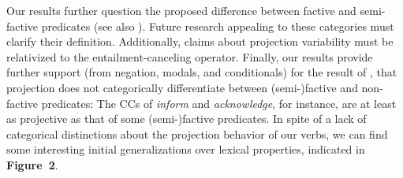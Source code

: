 \documentclass[12pt, a4paper]{article}
\begin{document}
	Our results further question the proposed difference between factive and semi-factive predicates (see also \citealp{beaver_have_2010}).
	Future research appealing to these categories must clarify their definition. Additionally, claims about projection variability must be relativized to the entailment-canceling operator.
	Finally, our results provide further support (from negation, modals, and conditionals) for the result of \citet{degen_are_2022}, that projection does not categorically differentiate between (semi-)factive and non-factive predicates: The CCs of \emph{inform} and \emph{acknowledge}, for instance, are at least as projective as that of some (semi-)factive predicates.
	In spite of a lack of categorical distinctions about the projection behavior of our verbs, we can find some interesting initial generalizations over lexical properties, indicated in \textbf{Figure\ 2}.
	
\end{document}
